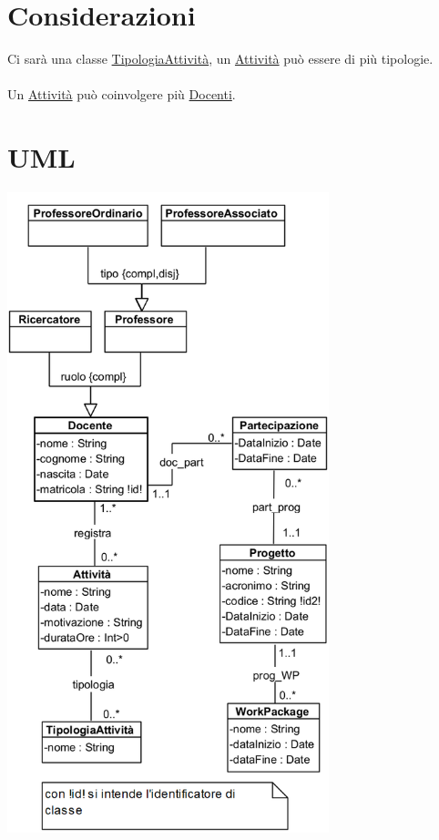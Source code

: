 \documentclass[12pt, letterpaper]{article}
\newcommand{\acc}{\\\hphantom{}\\}
\begin{document}
\section{Considerazioni}
Ci sarà una classe \underline{TipologiaAttività}, un \underline{Attività} può essere di 
più tipologie.\acc Un \underline{Attività} può coinvolgere più \underline{Docenti}.\newpage
\section{UML}\begin{center}
    
    \includegraphics[width=0.7\textwidth]{images/UML.png}
\end{center}
\end{document}

